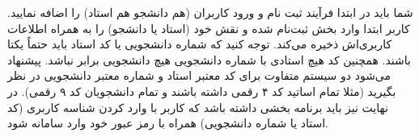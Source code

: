 شما باید در ابتدا فرآیند ثبت نام و ورود کاربران (هم دانشجو هم استاد) را اضافه نمایید. کاربر ابتدا وارد بخش ثبت‌نام شده و نقش خود (استاد یا دانشجو) را به همراه اطلاعات کاربری‌اش ذخیره می‌کند. توجه کنید که شماره دانشجویی یا کد استاد باید حتماً یکتا باشند. همچنین کد هیچ استادی با شماره دانشجویی هیچ دانشجویی برابر نباشد. پیشنهاد می‌شود دو سیستم متفاوت برای کد معتبر استاد و شماره معتبر دانشجویی در نظر بگیرید (مثلا تمام اساتید کد ۴ رقمی داشته باشند و تمام دانشجویان کد ۹ رقمی). در نهایت نیز باید برنامه بخشی داشته باشد که کاربر با وارد کردن شناسه کاربری (کد استاد یا شماره دانشجویی) همراه با رمز عبور خود وارد سامانه شود.